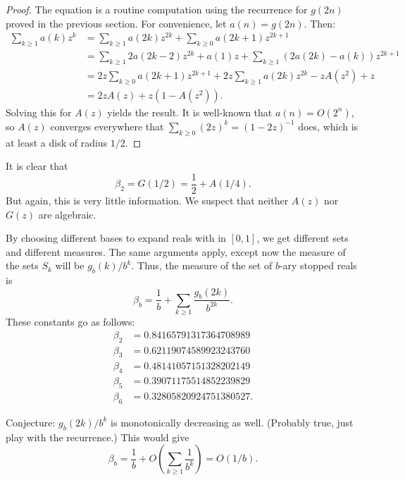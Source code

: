 \documentclass[12pt]{amsart}
\theoremstyle{definition}
\begin{document}
\begin{proof}
    The equation is a routine computation using the recurrence for $g(2n)$ proved in
    the previous section. For convenience, let $a(n) = g(2n)$. Then:
    \begin{align*}
        \sum_{k \geq 1} a(k) z^k
            &= \sum_{k \geq 1} a(2k) z^{2k} + \sum_{k \geq 0} a(2k + 1) z^{2k + 1} \\
            &= \sum_{k \geq 1} 2 a(2k - 2) z^{2k} + a(1) z + \sum_{k \geq 1} (2a(2k) - a(k)) z^{2k + 1} \\
            &= 2 z \sum_{k \geq 0} a(2k + 1) z^{2k + 1} + 2 z \sum_{k \geq 1} a(2k) z^{2k} - z A(z^2) + z \\
            &= 2z A(z) + z(1 - A(z^2)).
    \end{align*}
    Solving this for $A(z)$ yields the result. It is well-known that $a(n) =
    O(2^n)$, so $A(z)$ converges everywhere that $\sum_{k \geq 0} (2z)^k = (1 -
    2z)^{-1}$ does, which is at least a disk of radius $1/2$.
\end{proof}

It is clear that
\begin{equation*}
    \beta_2 = G(1/2) =\frac{1}{2} + A(1/4).
\end{equation*}
But again, this is very little information. We suspect that neither $A(z)$ nor
$G(z)$ are algebraic.

By choosing different bases to expand reals with in $[0, 1]$, we get different
sets and different measures. The same arguments apply, except now the measure
of the sets $S_k$ will be $g_b(k) / b^k$. Thus, the measure of the set of
$b$-ary stopped reals is
\begin{equation*}
    \beta_b = \frac{1}{b} + \sum_{k \geq 1} \frac{g_b(2k)}{b^{2k}}.
\end{equation*}
These constants go as follows:
\begin{align*}
    \beta_2 &= 0.84165791317364708989 \\
    \beta_3 &= 0.62119074589923243760 \\
    \beta_4 &= 0.48141057151328202149 \\
    \beta_5 &= 0.39071175514852239829 \\
    \beta_6 &= 0.32805820924751380527.
\end{align*}

Conjecture: $g_b(2k) / b^k$ is monotonically decreasing as well. (Probably
true, just play with the recurrence.) This would give
\begin{equation*}
    \beta_b = \frac{1}{b} + O(\sum_{k \geq 1} \frac{1}{b^k}) = O(1/b).
\end{equation*}
\end{document}
